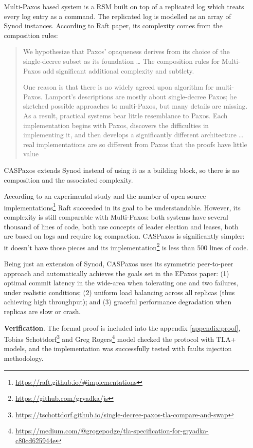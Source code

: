 \documentclass[12pt]{article}
\theoremstyle{definition}
\begin{document}
Multi-Paxos based system is a RSM built on top of a replicated log which treats every log entry as a command. The replicated log is modelled as an array of Synod instances. According to Raft paper, its complexity comes from the composition rules:

\begin{quote}
We hypothesize that Paxos’ opaqueness derives from its choice of the single-decree subset as its foundation \ldots{} The composition rules for Multi-Paxos add significant additional complexity and subtlety.

One reason is that there is no widely agreed upon algorithm for multi-Paxos. Lamport’s descriptions are mostly about single-decree Paxos; he sketched possible approaches to multi-Paxos, but many details are missing. As a result, practical systems bear little resemblance to Paxos. Each implementation begins with Paxos, discovers the difficulties in implementing it, and then develops a significantly different architecture \ldots{} real implementations are so different from Paxos that the proofs have little value
\end{quote}

CASPaxos extends Synod instead of using it as a building block, so there is no composition and the associated complexity.

According to an experimental study\cite{raft} and the number of open source implementations\footnote{\href{https://raft.github.io/\#implementations}{https://raft.github.io/\#implementations}} Raft succeeded in its goal to be understandable. However, its complexity is still comparable with Multi-Paxos: both systems\cite{chubby}\cite{raft} have several thousand of lines of code, both use concepts of leader election and leases, both are based on logs and require log compaction. CASPaxos is significantly simpler: it doesn't have those pieces and its implementation\footnote{\href{https://github.com/gryadka/js}{https://github.com/gryadka/js}} is less than 500 lines of code.

Being just an extension of Synod, CASPaxos uses its symmetric peer-to-peer approach and automatically achieves the goals set in the EPaxos\cite{epaxos} paper: (1) optimal commit latency in the wide-area when tolerating one and two failures, under realistic conditions; (2) uniform load balancing across all replicas (thus achieving high throughput); and (3) graceful performance degradation when replicas are slow or crash.

{\bf Verification}. The formal proof is included into the appendix \ref{appendix:proof}, Tobias Schottdorf\footnote{\href{https://tschottdorf.github.io/single-decree-paxos-tla-compare-and-swap}{https://tschottdorf.github.io/single-decree-paxos-tla-compare-and-swap}} and Greg Rogers\footnote{\href{https://medium.com/@grogepodge/tla-specification-for-gryadka-c80cd625944e}{https://medium.com/@grogepodge/tla-specification-for-gryadka-c80cd625944e}} model checked the protocol with TLA+ models, and the implementation was successfully tested with faults injection methodology.
\end{document}
